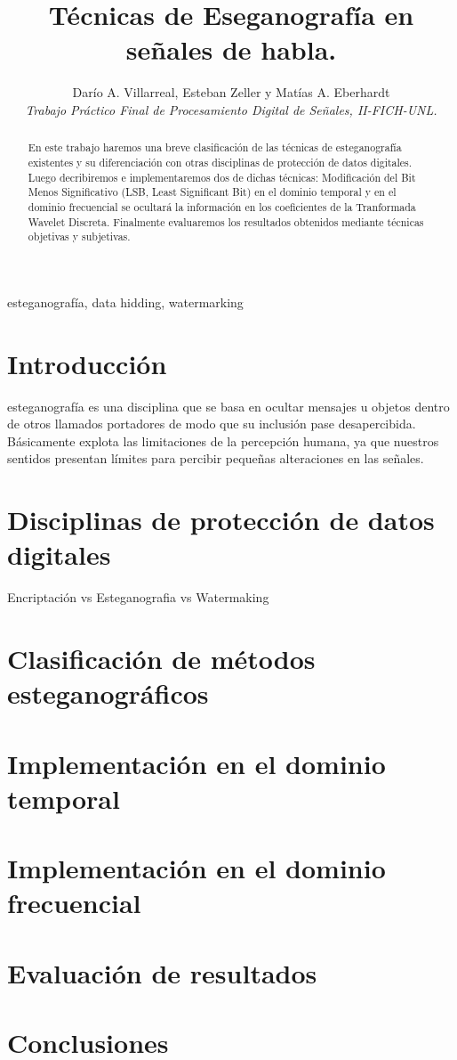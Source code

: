 \documentclass[conference,a4paper,10pt, oneside,final]{tfmpd}
\begin{document}
\title{Técnicas de Eseganografía en señales de habla.}

\author{Darío A. Villarreal,
        Esteban Zeller y
        Matías A. Eberhardt\\
\textit{Trabajo Práctico Final de Procesamiento Digital de Señales, II-FICH-UNL.}}


\maketitle

\begin{abstract}
En este trabajo haremos una breve clasificación de las técnicas de esteganografía existentes y su diferenciación con otras disciplinas de protección de datos digitales. Luego decribiremos e implementaremos dos de dichas técnicas: Modificación del Bit Menos Significativo (LSB, Least Significant Bit) en el dominio temporal y en el dominio frecuencial se ocultará la información en los coeficientes de la Tranformada Wavelet Discreta. Finalmente evaluaremos los resultados obtenidos mediante técnicas objetivas y subjetivas.
\end{abstract}

\begin{keywords}
esteganografía, data hidding, watermarking
\end{keywords}

\section{Introducción}
   

 esteganografía es una disciplina que se basa en ocultar mensajes u objetos dentro de otros llamados portadores de modo que su inclusión pase desapercibida. Básicamente explota las limitaciones de la percepción humana, ya que nuestros sentidos presentan límites para percibir pequeñas alteraciones en las señales.

\section{Disciplinas de protección de datos digitales}
Encriptación vs Esteganografia vs Watermaking

\section{Clasificación de métodos esteganográficos}
\section{Implementación en el dominio temporal}
\section{Implementación en el dominio frecuencial}
\section{Evaluación de resultados}
\section{Conclusiones}

\nocite{*}


\end{document}
